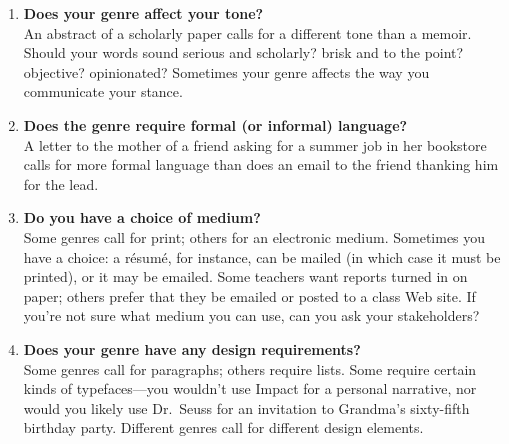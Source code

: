 \documentclass[10pt,oneside]{amsart}	%
\begin{document}
\begin{enumerate}
\begin{enumerate}
\item \textbf{Does your genre affect your tone?}\\ An abstract of a scholarly paper calls for a different tone than a memoir. Should your words sound serious and scholarly? brisk and to the point? objective? opinionated? Sometimes your genre affects the way you communicate your stance.
\item \textbf{Does the genre require formal (or informal) language?}\\ A letter to the mother of a friend asking for a summer job in her bookstore calls for more formal language than does an email to the friend thanking him for the lead.
\item \textbf{Do you have a choice of medium?}\\ Some genres call for print; others for an electronic medium. Sometimes you have a choice: a résumé, for instance, can be mailed (in which case it must be printed), or it may be emailed. Some teachers want reports turned in on paper; others prefer that they be emailed or posted to a class Web site. If you’re not sure what medium you can use, can you ask your stakeholders?
\item \textbf{Does your genre have any design requirements?}\\ Some genres call for paragraphs; others require lists. Some require certain kinds of typefaces—you wouldn’t use Impact for a personal narrative, nor would you likely use Dr.\ Seuss for an invitation to Grandma’s sixty-fifth birthday party. Different genres call for different design elements.
		\end{enumerate}
	\end{enumerate} %

\end{document}
